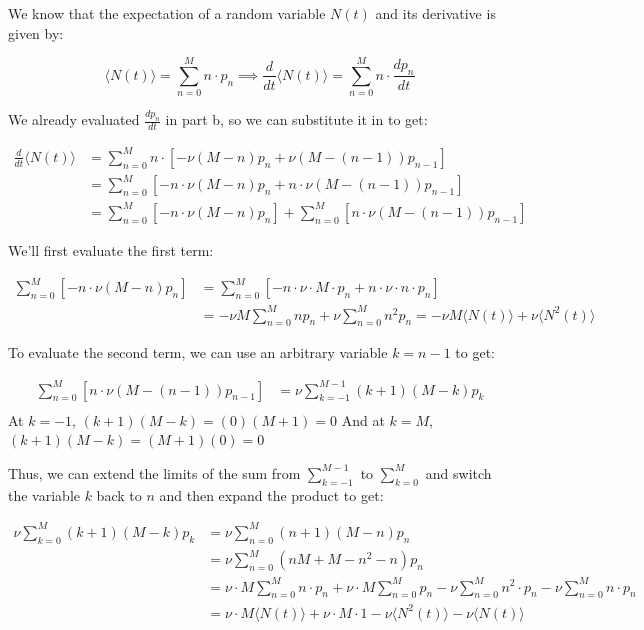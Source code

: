 \documentclass{article}
\begin{document}
We know that the expectation of a random variable $N(t)$ and its derivative is
given by:

\[
    \langle N(t) \rangle = \sum_{n=0}^{M} n \cdot p_n \implies \frac{d}{dt} \langle N(t) \rangle = \sum_{n=0}^{M} n \cdot \frac{dp_n}{dt}
\]

We already evaluated $\frac{dp_n}{dt}$ in part b, so we can substitute it in to
get:

\begin{align*}
    \frac{d}{dt} \langle N(t) \rangle & = \sum_{n=0}^{M} n \cdot [- \nu(M-n)p_n + \nu(M-(n-1))p_{n-1}]                        \\
                                      & = \sum_{n=0}^{M}[- n \cdot \nu(M-n)p_n + n \cdot \nu(M-(n-1))p_{n-1}]                 \\
                                      & = \sum_{n=0}^{M}[- n \cdot \nu(M-n)p_n] + \sum_{n=0}^{M}[n \cdot \nu(M-(n-1))p_{n-1}]
\end{align*}

We'll first evaluate the first term:

\begin{align*}
    \sum_{n=0}^{M}[- n \cdot \nu(M-n)p_n] & = \sum_{n=0}^{M}[- n \cdot \nu \cdot M \cdot p_n + n \cdot \nu \cdot n \cdot p_n]                                     \\
                                          & = -\nu M \sum_{n=0}^{M} n p_n + \nu \sum_{n=0}^{M} n^2 p_n = -\nu M \langle N(t) \rangle + \nu \langle N^2(t) \rangle
\end{align*}

To evaluate the second term, we can use an arbitrary variable $k = n-1$ to get:

\begin{align*}
    \sum_{n=0}^{M}[n \cdot \nu(M-(n-1))p_{n-1}] & = \nu \sum_{k=-1}^{M-1} (k+1) (M-k) p_k \\
\end{align*}
At $k = -1$, $(k+1)(M-k) = (0)(M+1) = 0$ And at $k = M$, $(k+1)(M-k) = (M+1)(0) = 0$

Thus, we can extend the limits of the sum from $\sum_{k=-1}^{M-1}$ to
$\sum_{k=0}^{M}$ and switch the variable $k$ back to $n$ and then expand the
product to get:

\begin{align*}
    \nu \sum_{k=0}^{M} (k+1) (M-k) p_k & = \nu \sum_{n=0}^{M} (n+1) (M-n) p_n                                                                                                          \\
                                       & = \nu \sum_{n=0}^{M} (nM + M - n^2 - n) p_n                                                                                                   \\
                                       & = \nu \cdot M \sum_{n=0}^{M} n \cdot p_n + \nu \cdot M \sum_{n=0}^{M} p_n - \nu \sum_{n=0}^{M} n^2 \cdot p_n - \nu \sum_{n=0}^{M} n \cdot p_n \\
                                       & = \nu \cdot M \langle N(t) \rangle + \nu \cdot M \cdot 1 - \nu \langle N^2(t) \rangle - \nu \langle N(t) \rangle
\end{align*}
\end{document}
